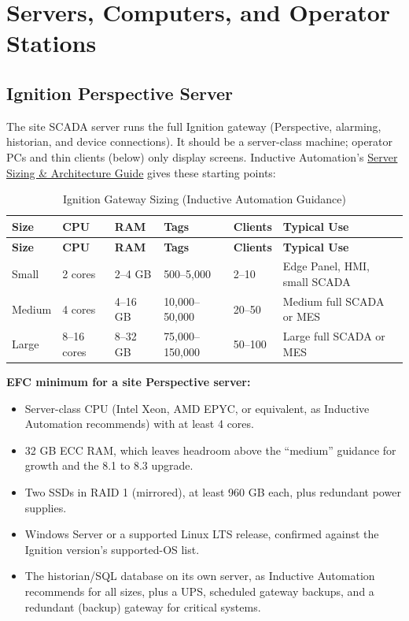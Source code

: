 \section{Servers, Computers, and Operator Stations}\label{sec:computers}
\subsection{Ignition Perspective Server}\label{sec:ignition-server}
The site SCADA server runs the full Ignition gateway (Perspective, alarming, historian, and device connections). It should be a server-class machine; operator PCs and thin clients (below) only display screens. Inductive Automation's \href{https://inductiveautomation.com/resources/article/ignition-server-sizing-and-architecture-guide}{Server Sizing \& Architecture Guide} gives these starting points:

\begin{longtable}{@{}P{2.23cm}P{2.04cm}P{1.83cm}P{2.64cm}P{2.64cm}P{4.27cm}@{}}
\caption{Ignition Gateway Sizing (Inductive Automation Guidance)}\label{tab:ignition-sizing} \\
\toprule
{}\textbf{Size} & \textbf{CPU} & \textbf{RAM} & \textbf{Tags} & \textbf{Clients} & \textbf{Typical Use} \\
\midrule
\endfirsthead
\toprule
{}\textbf{Size} & \textbf{CPU} & \textbf{RAM} & \textbf{Tags} & \textbf{Clients} & \textbf{Typical Use} \\
\midrule
\endhead
Small & 2 cores & 2--4 GB & 500--5,000 & 2--10 & Edge Panel, HMI, small SCADA \\
Medium & 4 cores & 4--16 GB & 10,000--50,000 & 20--50 & Medium full SCADA or MES \\
Large & 8--16 cores & 8--32 GB & 75,000--150,000 & 50--100 & Large full SCADA or MES \\
\bottomrule
\end{longtable}

\textbf{EFC minimum for a site Perspective server:}
\begin{itemize}[itemsep=1pt]
  \item Server-class CPU (Intel Xeon, AMD EPYC, or equivalent, as Inductive Automation recommends) with at least 4 cores.
  \item 32 GB ECC RAM, which leaves headroom above the ``medium'' guidance for growth and the 8.1 to 8.3 upgrade.
  \item Two SSDs in RAID 1 (mirrored), at least 960 GB each, plus redundant power supplies.
  \item Windows Server or a supported Linux LTS release, confirmed against the Ignition version's supported-OS list.
  \item The historian/SQL database on its own server, as Inductive Automation recommends for all sizes, plus a UPS, scheduled gateway backups, and a redundant (backup) gateway for critical systems.
\end{itemize}

